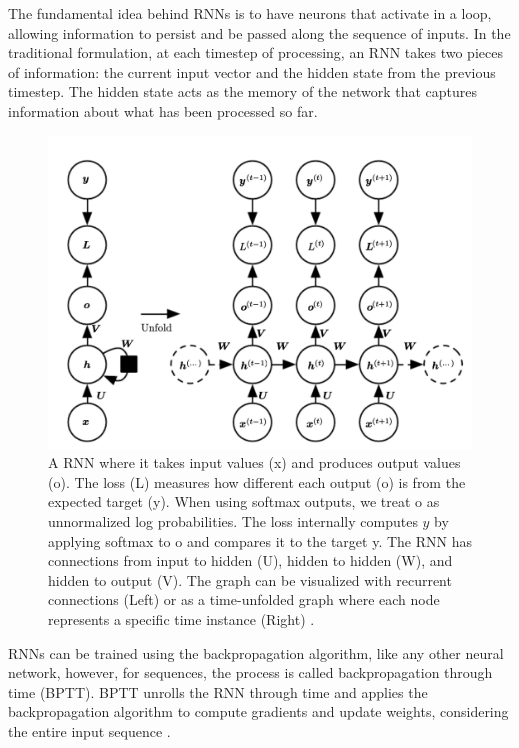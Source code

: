 \documentclass[UKenglish]{uiomasterthesis}
\begin{document}
The fundamental idea behind RNNs is to have neurons that activate in a loop, allowing information to persist and be passed along the sequence of inputs. In the traditional formulation, at each timestep of processing, an RNN takes two pieces of information: the current input vector and the hidden state from the previous timestep. The hidden state acts as the memory of the network that captures information about what has been processed so far.

\begin{figure}
    \centering
    \includegraphics[width=0.7\linewidth]{Figures/RNN.png}
    \caption{A RNN where it takes input values (x) and produces output values (o). The loss (L) measures how different each output (o) is from the expected target (y). When using softmax outputs, we treat o as unnormalized log probabilities. The loss internally computes \begin{math}\hat{y}\end{math} by applying softmax to o and compares it to the target y. The RNN has connections from input to hidden (U), hidden to hidden (W), and hidden to output (V). The graph can be visualized with recurrent connections (Left) or as a time-unfolded graph where each node represents a specific time instance (Right) \cite{goodfellow_deep_2016}.}
    \label{fig:RNN}
\end{figure}

RNNs can be trained using the backpropagation algorithm, like any other neural network, however, for sequences, the process is called backpropagation through time (BPTT). BPTT unrolls the RNN through time and applies the backpropagation algorithm to compute gradients and update weights, considering the entire input sequence \cite{goodfellow_deep_2016}.
\end{document}
